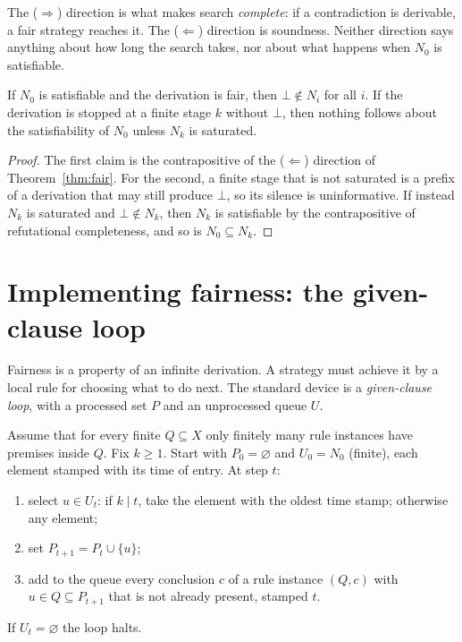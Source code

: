 The ($\Rightarrow$) direction is what makes search \emph{complete}: if a contradiction is derivable, a fair strategy reaches it. The ($\Leftarrow$) direction is soundness. Neither direction says anything about how long the search takes, nor about what happens when $N_0$ is satisfiable.

\begin{corollary}
\label{cor:silent}
If $N_0$ is satisfiable and the derivation is fair, then $\bot\notin N_i$ for all $i$. If the derivation is stopped at a finite stage $k$ without $\bot$, then nothing follows about the satisfiability of $N_0$ unless $N_k$ is saturated.
\end{corollary}

\begin{proof}
The first claim is the contrapositive of the ($\Leftarrow$) direction of Theorem~\ref{thm:fair}. For the second, a finite stage that is not saturated is a prefix of a derivation that may still produce $\bot$, so its silence is uninformative. If instead $N_k$ is saturated and $\bot\notin N_k$, then $N_k$ is satisfiable by the contrapositive of refutational completeness, and so is $N_0\subseteq N_k$.
\end{proof}

\section{Implementing fairness: the given-clause loop}
\label{sec:given-clause}

Fairness is a property of an infinite derivation. A strategy must achieve it by a local rule for choosing what to do next. The standard device is a \emph{given-clause loop}, with a processed set $P$ and an unprocessed queue $U$.

\begin{definition}
\label{def:given-clause}
Assume that for every finite $Q\subseteq X$ only finitely many rule instances have premises inside $Q$. Fix $k\ge1$. Start with $P_0=\varnothing$ and $U_0=N_0$ (finite), each element stamped with its time of entry. At step $t$:
\begin{enumerate}[nosep]
\item select $u\in U_t$: if $k\mid t$, take the element with the oldest time stamp; otherwise any element;
\item set $P_{t+1}=P_t\cup\{u\}$;
\item add to the queue every conclusion $c$ of a rule instance $(Q,c)$ with $u\in Q\subseteq P_{t+1}$ that is not already present, stamped $t$.
\end{enumerate}
If $U_t=\varnothing$ the loop halts.
\end{definition}

